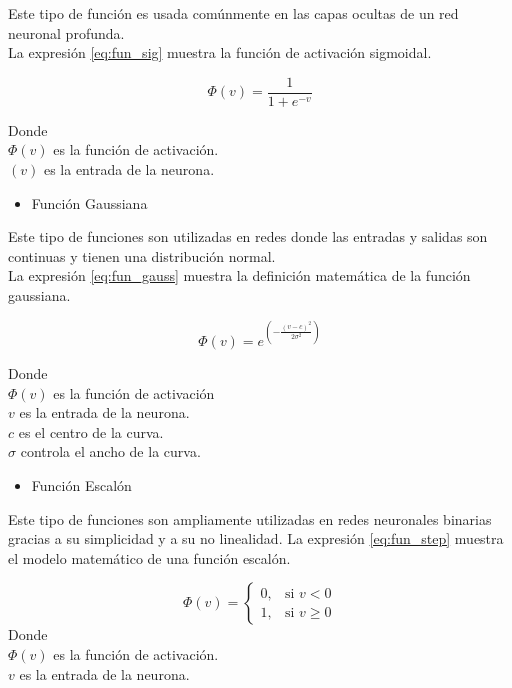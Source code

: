     Este tipo de función es usada comúnmente en las capas ocultas de un red neuronal profunda.\\
    La expresión \ref{eq:fun_sig} muestra la función de activación sigmoidal.

    \begin{equation}
        \Phi(v) = \frac{1}{1 + e^{-v}}
        \label{eq:fun_sig}
    \end{equation}

    Donde\\
    \noindent
    $\Phi(v)$ es la función de activación.\\
    $(v)$ es la entrada de la neurona.\\

    \begin{itemize}
        \item Función Gaussiana
    \end{itemize}

    Este tipo de funciones son utilizadas en redes donde las entradas y salidas son continuas y tienen una distribución normal.\\
    La expresión \ref{eq:fun_gauss} muestra la definición matemática de la función gaussiana.

    \begin{equation}
        \Phi(v) = \displaystyle e^{\left( -\frac{(v-c)^2}{2\sigma^2} \right)}
        \label{eq:fun_gauss}
    \end{equation}

    Donde\\
    $\Phi(v)$ es la función de activación\\
    $v$ es la entrada de la neurona.\\
    $c$ es el centro de la curva.\\
    $\sigma$ controla el ancho de la curva.\\
    
    \begin{itemize}
        \item Función Escalón 
    \end{itemize}

    Este tipo de funciones son ampliamente utilizadas en redes neuronales binarias gracias a su simplicidad y a su no linealidad.
    La expresión \ref{eq:fun_step} muestra el modelo matemático de una función escalón.

    \begin{equation}
        \Phi(v) = \begin{cases}
            0, & \text{si } v < 0 \\
            1, & \text{si } v \geq 0
            \end{cases}
        \label{eq:fun_step}
    \end{equation}
    Donde\\
    $\Phi(v)$ es la función de activación.\\
    $v$ es la entrada de la neurona.
    


